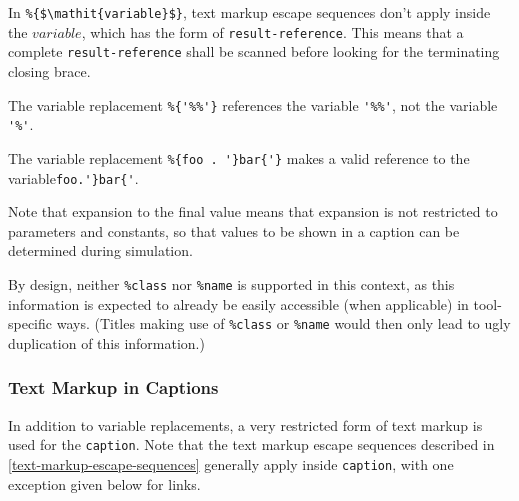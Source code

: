 In \lstinline!%{$\mathit{variable}$}!, text markup escape sequences don't apply inside the $\mathit{variable}$, which has the form of \lstinline[language=grammar]!result-reference!.
This means that a complete \lstinline[language=grammar]!result-reference! shall be scanned before looking for the terminating closing brace.

\begin{example}
The variable replacement \lstinline!%{'%%'}! references the variable \lstinline!'%%'!, not the variable \lstinline!'%'!.
\end{example}

\begin{example}
The variable replacement \lstinline!%{foo . '}bar{'}! makes a valid reference to the variable\linebreak[4] \lstinline!foo.'}bar{'!.
\end{example}

Note that expansion to the final value means that expansion is not restricted to parameters and constants, so that values to be shown in a caption can be determined during simulation.

\begin{nonnormative}
By design, neither \lstinline!%class! nor \lstinline!%name! is supported in this context, as this information is expected to already be easily accessible (when applicable) in tool-specific ways.
(Titles making use of \lstinline!%class! or \lstinline!%name! would then only lead to ugly duplication of this information.)
\end{nonnormative}

\subsubsection{Text Markup in Captions}\label{text-markup-in-captions}

In addition to variable replacements, a very restricted form of text markup is used for the \lstinline!caption!.
Note that the text markup escape sequences described in \cref{text-markup-escape-sequences} generally apply inside \lstinline!caption!, with one exception given below for links.

